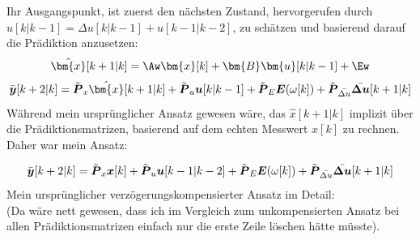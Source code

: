\newpage

Ihr Ausgangspunkt, ist zuerst den nächsten Zustand, hervorgerufen durch $u[k|k-1] = \Delta u[k|k-1] + u[k-1|k-2]$, zu schätzen und basierend darauf die Prädiktion anzusetzen:
\[
\hat{\bm{x}}[k+1|k] = \Aw \bm{x}[k] + \bm{B}\bm{u}[k|k-1] + \Ew
\]
\[
\Bar{\boldsymbol{y}}[k+2|k] = { \Tilde{\boldsymbol{P}}_{x} \hat{\bm{x}}[k+1|k] 
	+ \Tilde{\boldsymbol{P}}_u \boldsymbol{u}[k|k-1] + \Tilde{\boldsymbol{P}}_{E}{\boldsymbol{E}}(\omega[k]) }+ \Tilde{\boldsymbol{P}}_{\Bar{\Delta u}} {\Bar{\boldsymbol{\Delta u}}}[k+1|k] 
\]
Während mein ursprünglicher Ansatz gewesen wäre, das $\hat{{x}}[k+1|k] $ implizit über die Prädiktionsmatrizen, basierend auf dem echten Messwert $ {x}[k]$ zu rechnen. \\
Daher war mein Ansatz:

\begin{equation}
\Bar{\boldsymbol{y}}[k+2|k] = { \Tilde{\boldsymbol{P}}_{x} {\boldsymbol{x}}[k]
	+ \Tilde{\boldsymbol{P}}_u \boldsymbol{u}[k-1|k-2] + \Tilde{\boldsymbol{P}}_{E}{\boldsymbol{E}}({\omega}[k]) } + \Tilde{\boldsymbol{P}}_{\Bar{\Delta u}} {\Bar{\boldsymbol{\Delta u}}}[k+1|k] 
	\label{equ:2_prediction_dtc}
\end{equation}
Mein ursprünglicher verzögerungskompensierter Ansatz im Detail:\\
(Da wäre nett gewesen, dass ich im Vergleich zum unkompensierten Ansatz bei allen Prädiktionsmatrizen einfach nur die erste Zeile löschen hätte müsste).

